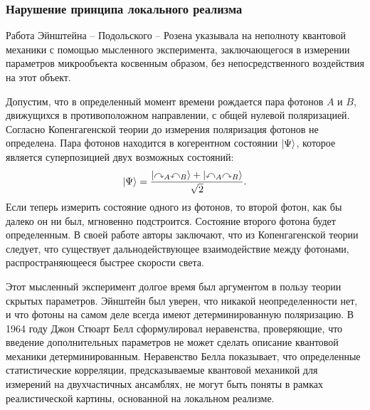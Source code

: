 
\subsubsection{Нарушение принципа локального реализма}
Работа Эйнштейна -- Подольского -- Розена\cite{Einstein1935}
указывала на неполноту квантовой механики с помощью мысленного эксперимента,
заключающегося в измерении параметров микрообъекта косвенным образом,
без непосредственного воздействия на этот объект.

Допустим, что в определенный момент времени рождается пара фотонов $A$ и $B$,
движущихся в противоположном направлении,
с общей нулевой поляризацией.
Согласно Копенгагенской теории до измерения поляризация фотонов не определена.
Пара фотонов находится в когерентном состоянии $\left| \Psi \right\rangle$,
которое является суперпозицией двух возможных состояний:
\begin{equation}\label{eq:entangled-state}
  \left| \Psi \right\rangle = \dfrac{
    \left| \curvearrowright_A \curvearrowleft_B \right\rangle
    + \left| \curvearrowleft_A \curvearrowright_B \right\rangle
  }{\sqrt{2}}.
\end{equation}
Если теперь измерить состояние одного из фотонов,
то второй фотон,
как бы далеко он ни был,
мгновенно подстроится.
Состояние второго фотона будет определенным.
В своей работе\cite{Einstein1935} авторы заключают,
что из Копенгагенской теории следует,
что существует дальнодействующее взаимодействие между фотонами,
распространяющееся быстрее скорости света.

Этот мысленный эксперимент долгое время был аргументом
в пользу теории скрытых параметров.
Эйнштейн был уверен,
что никакой неопределенности нет,
и что фотоны на самом деле всегда имеют детерминированную поляризацию.
В 1964 году Джон Стюарт Белл сформулировал неравенства\cite{Bell1964},
проверяющие,
что введение дополнительных параметров не может сделать описание квантовой механики детерминированным.
Неравенство Белла показывает,
что определенные статистические корреляции,
предсказываемые квантовой механикой для измерений на двухчастичных ансамблях,
не могут быть поняты в рамках реалистической картины,
основанной на локальном реализме\cite{Einstein1935}.

